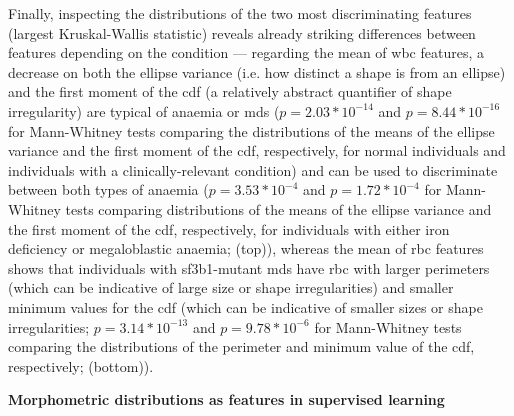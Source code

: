 Finally, inspecting the distributions of the two most discriminating features (largest Kruskal-Wallis statistic) reveals already striking differences between features depending on the condition --- regarding the mean of \ac{wbc} features, a decrease on both the ellipse variance (i.e. how distinct a shape is from an ellipse) and the first moment of the \ac{cdf} (a relatively abstract quantifier of shape irregularity) are typical of anaemia or \ac{mds} ($p=2.03*10^{-14}$ and $p=8.44*10^{-16}$ for Mann-Whitney tests comparing the distributions of the means of the ellipse variance and the first moment of the \ac{cdf}, respectively, for normal individuals and individuals with a clinically-relevant condition) and can be used to discriminate between both types of anaemia ($p=3.53*10^{-4}$ and $p=1.72*10^{-4}$ for Mann-Whitney tests comparing distributions of the means of the ellipse variance and the first moment of the \ac{cdf}, respectively, for individuals with either iron deficiency or megaloblastic anaemia;  (top)), whereas the mean of \ac{rbc} features shows that individuals with \ac{sf3b1}-mutant \ac{mds} have \ac{rbc} with larger perimeters (which can be indicative of large size or shape irregularities) and smaller minimum values for the \ac{cdf} (which can be indicative of smaller sizes or shape irregularities; $p=3.14*10^{-13}$ and $p=9.78*10^{-6}$ for Mann-Whitney tests comparing the distributions of the perimeter and minimum value of the \ac{cdf}, respectively;  (bottom)).

\begin{figure}[!ht]
    \label{fig:feature-distribution-mean}
\end{figure}

\noindent \textbf{Morphometric distributions as features in supervised learning}

